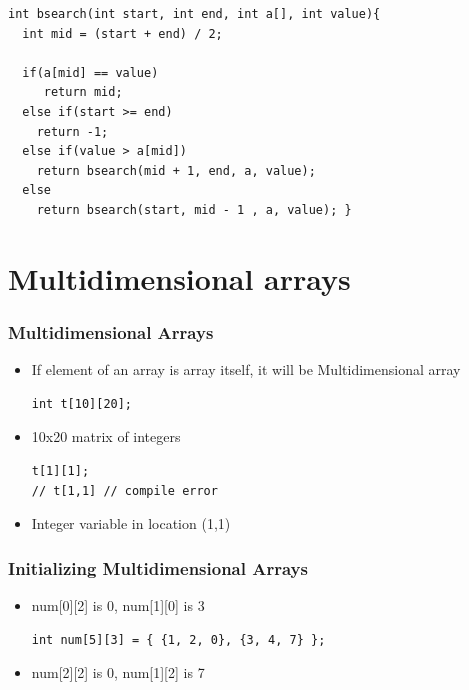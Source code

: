 \documentclass{../c-lecture}
\begin{document}
\begin{frame}[fragile]
  \begin{verbatim}
int bsearch(int start, int end, int a[], int value){
  int mid = (start + end) / 2;

  if(a[mid] == value)
     return mid;
  else if(start >= end)
    return -1;
  else if(value > a[mid])
    return bsearch(mid + 1, end, a, value);
  else
    return bsearch(start, mid - 1 , a, value); }
  \end{verbatim}
\end{frame}

\section{Multidimensional arrays}

\begin{frame}[fragile]
  \frametitle{Multidimensional Arrays}
  \begin{itemize}
    \item
      If element of an array is array itself, it will be Multidimensional array

    \begin{verbatim}
int t[10][20];
    \end{verbatim}
    \item 10x20 matrix of integers
    \begin{verbatim}
t[1][1];
// t[1,1] // compile error
    \end{verbatim}
    \item Integer variable in location (1,1)
  \end{itemize}
\end{frame}

\begin{frame}[fragile]
  \frametitle{Initializing Multidimensional Arrays}
  \begin{itemize}
    \begin{verbatim}
int num[2][3] = {1, 2, 0, 3, 4, 7};
int num[2][3] = { {1, 2, 0}, {3, 4, 7} };
    \end{verbatim}
    \item num[0][2] is 0, num[1][0] is 3
    \begin{verbatim}
int num[5][3] = { {1, 2, 0}, {3, 4, 7} };
    \end{verbatim}
    \item num[2][2] is 0, num[1][2] is 7
  \end{itemize}
\end{frame}
\end{document}
